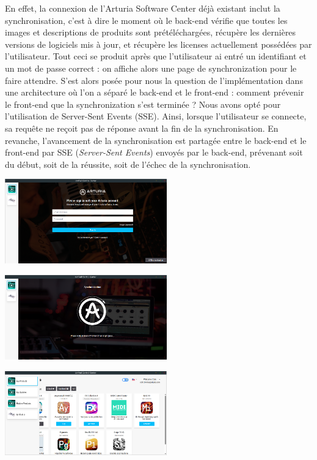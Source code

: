\documentclass[francais]{rapportPFE}  %
\begin{document}
En effet, la connexion de l'Arturia Software Center déjà existant inclut la synchronisation, c'est à dire le moment où le back-end vérifie que toutes les images et descriptions de produits sont prétéléchargées, récupère les dernières versions de logiciels mis à jour, et récupère les licenses actuellement possédées par l'utilisateur. Tout ceci se produit après que l'utilisateur ai entré un identifiant et un mot de passe correct : on affiche alors une page de synchronization pour le faire attendre. S'est alors posée pour nous la question de l'implémentation dans une architecture où l'on a séparé le back-end et le front-end : comment prévenir le front-end que la synchronization s'est terminée ? Nous avons opté pour l'utilisation de Server-Sent Events (SSE). Ainsi, lorsque l'utilisateur se connecte, sa requête ne reçoit pas de réponse avant la fin de la synchronisation. En revanche, l'avancement de la synchronisation est partagée entre le back-end et le front-end par SSE (\textit{Server-Sent Events}) envoyés par le back-end, prévenant soit du début, soit de la réussite, soit de l'échec de la synchronisation.
\begin{center}
    \centering
    \begin{minipage}{.5\textwidth}
    \centering
    \includegraphics[width=7cm]{graphics/disconnected.png}
    \label{fig:test1}
    \end{minipage}%
    \begin{minipage}{.5\textwidth}
    \centering
    \includegraphics[width=7cm]{graphics/sync.png}
    \label{fig:test2}
    \end{minipage}
    \begin{minipage}{.5\textwidth}
    \centering
    \includegraphics[width=7cm]{graphics/connected.png}
    \label{fig:test2}
    \end{minipage}
\end{center}
\end{document}

